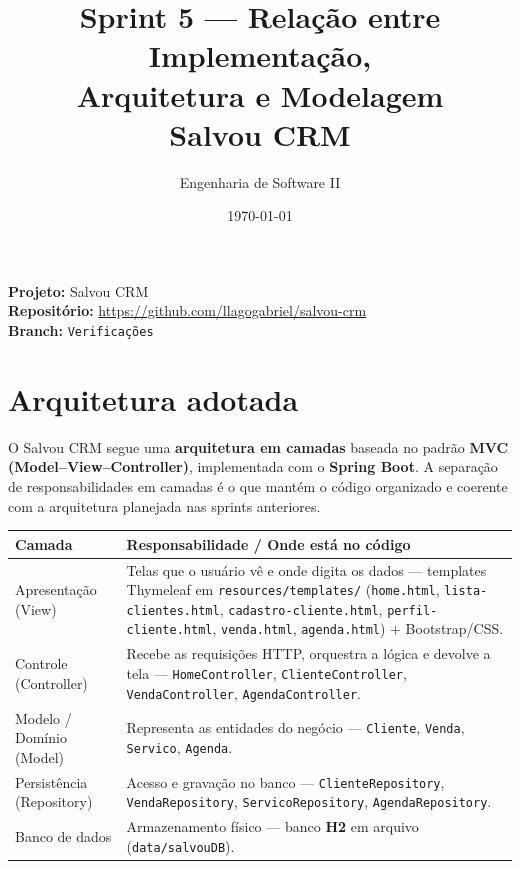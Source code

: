 \documentclass[12pt,a4paper]{article}
\title{\textbf{Sprint 5 --- Relação entre Implementação,\\ Arquitetura e Modelagem}\\[4pt]
\large Salvou CRM}
\author{Engenharia de Software II}
\date{\today}
\newcommand{\code}[1]{\texttt{#1}}
\begin{document}
\maketitle

\begin{flushleft}
\textbf{Projeto:} Salvou CRM \\
\textbf{Repositório:} \url{https://github.com/llagogabriel/salvou-crm} \\
\textbf{Branch:} \texttt{Verificações}
\end{flushleft}

\hrulefill

\section{Arquitetura adotada}

O Salvou CRM segue uma \textbf{arquitetura em camadas} baseada no padrão
\textbf{MVC (Model--View--Controller)}, implementada com o \textbf{Spring Boot}.
A separação de responsabilidades em camadas é o que mantém o código organizado e
coerente com a arquitetura planejada nas sprints anteriores.

\begin{center}
\renewcommand{\arraystretch}{1.3}
\begin{tabularx}{\textwidth}{l X}
\toprule
\textbf{Camada} & \textbf{Responsabilidade / Onde está no código} \\
\midrule
Apresentação (View) & Telas que o usuário vê e onde digita os dados --- templates
Thymeleaf em \code{resources/templates/} (\code{home.html}, \code{lista-clientes.html},
\code{cadastro-cliente.html}, \code{perfil-cliente.html}, \code{venda.html},
\code{agenda.html}) + Bootstrap/CSS. \\
Controle (Controller) & Recebe as requisições HTTP, orquestra a lógica e devolve a
tela --- \code{HomeController}, \code{ClienteController}, \code{VendaController},
\code{AgendaController}. \\
Modelo / Domínio (Model) & Representa as entidades do negócio --- \code{Cliente},
\code{Venda}, \code{Servico}, \code{Agenda}. \\
Persistência (Repository) & Acesso e gravação no banco --- \code{ClienteRepository},
\code{VendaRepository}, \code{ServicoRepository}, \code{AgendaRepository}. \\
Banco de dados & Armazenamento físico --- banco \textbf{H2} em arquivo
(\code{data/salvouDB}). \\
\bottomrule
\end{tabularx}
\end{center}
\end{document}

